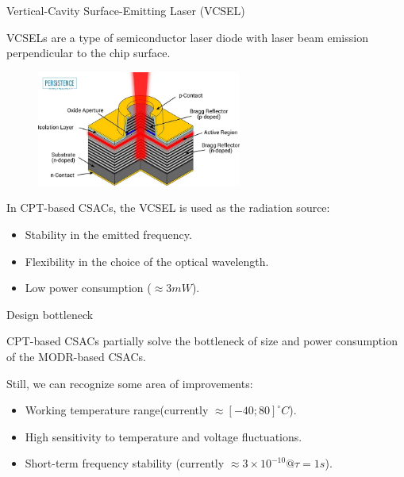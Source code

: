 \begin{frame}{Vertical-Cavity Surface-Emitting Laser (VCSEL)}




    VCSELs are a type of semiconductor laser diode with laser beam emission perpendicular to the chip surface.

    \begin{figure}
        \centering
        \includegraphics[width=0.6\textwidth]{img/CPT-VCSEL.png}
    \end{figure}

    In CPT-based CSACs, the VCSEL is used as the radiation source:

    \begin{itemize}
        \item Stability in the emitted frequency.
        \item Flexibility in the choice of the optical wavelength.
        \item Low power consumption ($\approx 3mW$).
    \end{itemize}

\end{frame}


\begin{frame}{Design bottleneck}

    CPT-based CSACs partially solve the bottleneck of size and power consumption of the MODR-based CSACs.

    \vspace{10pt}

    Still, we can recognize some area of improvements:

    \begin{itemize}
        \item Working temperature range\footnotemark[1] (currently $\approx [-40; 80]^{\circ}C$).
        \item High sensitivity to temperature and voltage fluctuations.
        \item Short-term frequency stability (currently $\approx 3 \times 10^{-10}@\tau=1s$).
    \end{itemize}


\end{frame}